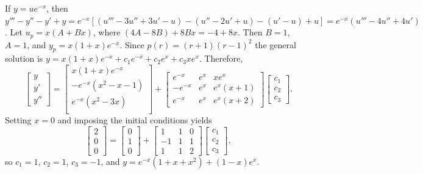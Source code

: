 \documentclass[dvips]{book}
\renewcommand{\exer}[1]{\par\medskip\;\noindent{\color{red}\bf #1.}}
\numberwithin{example}{section}
\numberwithin{equation}{section}
\numberwithin{theorem}{section}
\numberwithin{table}{section}
\numberwithin{figure}{section}
\newcommand{\threecol}[3]{\left[\begin{array}{r}#1\\#2\\#3\end{array}\right]}
\begin{document}
\exer{9.3.70}
 If $y=ue^{-x}$, then $y'''-y''-y'+y=e^{-x}[
(u'''-3u''+3u'-u) -(u''-2u'+u) -(u'-u) +u]
=e^{-x}(u'''-4u''+4u')$. Let $u_p=x(A+Bx)$, where
$(4A-8B)+8Bx=-4+8x$. Then $B=1$,
 $A=1$, and $y_p=x(1+x)e^{-x}$. Since $p(r)=(r+1)(r-1)^2$
the general solution is
 $y=x(1+x)e^{-x}+c_1e^{-x}+c_2e^x+c_3xe^x$.
 Therefore,
$$
\left[\begin{array}{l}y\\y'\\y''\end{array}\right]=
\left[\begin{array}{c}
x(1+x)e^{-x}\\
-e^{-x}(x^2-x-1)\\
e^{-x}(x^2-3x)\\
\end{array}\right]+
\left[\begin{array}{rcc}e^{-x}&e^x&xe^x\\
-e^{-x}&e^x&e^x(x+1)\\e^{-x}&e^x&e^x(x+2)\end{array}\right]
\threecol{c_1}{c_2}{c_3}.
$$
Setting $x=0$ and imposing the initial conditions yields
$$
\threecol200=\threecol010+
\left[\begin{array}{rcc}1&1&0\\-1&1&1\\1&1&2\end{array}\right]
\threecol{c_1}{c_2}{c_3},
$$
so $c_1=1$, $c_2=1$, $c_3=-1$, and
 $y=e^{-x}(1+x+x^2) +(1-x)e^x$.
\end{document}
